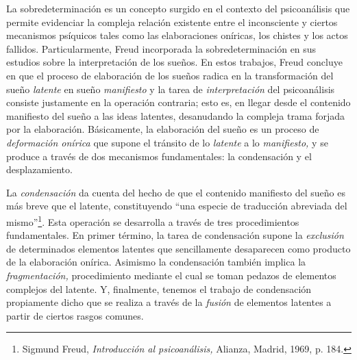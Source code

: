 La sobredeterminación es un concepto surgido en el contexto del psicoanálisis que permite evidenciar la compleja relación existente entre el inconsciente y ciertos mecanismos psíquicos tales como las elaboraciones oníricas, los chistes y los actos fallidos. Particularmente, Freud incorporada la sobredeterminación en sus estudios sobre la interpretación de los sueños. En estos trabajos, Freud concluye en que el proceso de elaboración de los sueños radica en la transformación del sueño \emph{latente} en sueño \emph{manifiesto} y la tarea de \emph{interpretación} del psicoanálisis consiste justamente en la operación contraria; esto es, en llegar desde el contenido manifiesto del sueño a las ideas latentes, desanudando la compleja trama forjada por la elaboración. Básicamente, la elaboración del sueño es un proceso de \emph{deformación onírica} que supone el tránsito de lo \emph{latente} a lo \emph{manifiesto,} y se produce a través de dos mecanismos fundamentales: la condensación y el desplazamiento.

La \emph{condensación} da cuenta del hecho de que el contenido manifiesto del sueño es más breve que el latente, constituyendo \enquote{una especie de traducción abreviada del mismo}\footnote{Sigmund Freud, \emph{Introducción al psicoanálisis,} Alianza, Madrid, 1969, p. 184.}. Esta operación se desarrolla a través de tres procedimientos fundamentales. En primer término, la tarea de condensación supone la \emph{exclusión} de determinados elementos latentes que sencillamente desaparecen como producto de la elaboración onírica. Asimismo la condensación también implica la \emph{fragmentación,} procedimiento mediante el cual se toman pedazos de elementos complejos del latente. Y, finalmente, tenemos el trabajo de condensación propiamente dicho que se realiza a través de la \emph{fusión} de elementos latentes a partir de ciertos rasgos comunes.

